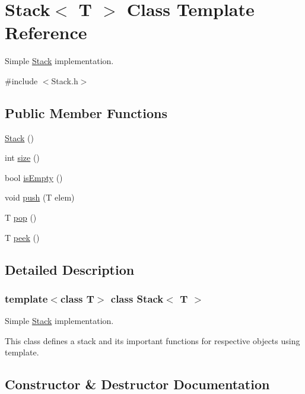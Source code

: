 \hypertarget{classStack}{}\section{Stack$<$ T $>$ Class Template Reference}
\label{classStack}


Simple \hyperlink{classStack}{Stack} implementation.  




{\ttfamily \#include $<$Stack.\+h$>$}

\subsection*{Public Member Functions}
\begin{DoxyCompactItemize}
\item 
\hyperlink{classStack_aefee698059467258bbd79045aca62a63}{Stack} ()
\item 
int \hyperlink{classStack_a3091d98f798b1b3e69b644d5b778c428}{size} ()
\item 
bool \hyperlink{classStack_ad0db0d9b249e871bb7504ed89a99d3a7}{is\+Empty} ()
\item 
void \hyperlink{classStack_af2f55e27cd06d2661d6d797ecba58559}{push} (T elem)
\item 
T \hyperlink{classStack_aa2ea0e8c3293648589dd734d52487408}{pop} ()
\item 
T \hyperlink{classStack_adcb4774ac8aa94cbc19b461da9bdee3a}{peek} ()
\end{DoxyCompactItemize}


\subsection{Detailed Description}
\subsubsection*{template$<$class T$>$\newline
class Stack$<$ T $>$}

Simple \hyperlink{classStack}{Stack} implementation. 

This class defines a stack and its important functions for respective objects using template. 

\subsection{Constructor \& Destructor Documentation}
\mbox{\label{classStack_aefee698059467258bbd79045aca62a63}} 
